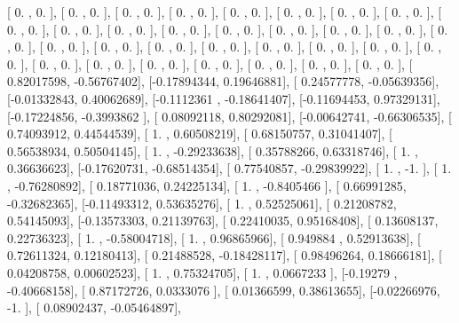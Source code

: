 \documentclass{article}
\begin{document}
       [ 0.        ,  0.        ],
       [ 0.        ,  0.        ],
       [ 0.        ,  0.        ],
       [ 0.        ,  0.        ],
       [ 0.        ,  0.        ],
       [ 0.        ,  0.        ],
       [ 0.        ,  0.        ],
       [ 0.        ,  0.        ],
       [ 0.        ,  0.        ],
       [ 0.        ,  0.        ],
       [ 0.        ,  0.        ],
       [ 0.        ,  0.        ],
       [ 0.        ,  0.        ],
       [ 0.        ,  0.        ],
       [ 0.        ,  0.        ],
       [ 0.        ,  0.        ],
       [ 0.        ,  0.        ],
       [ 0.        ,  0.        ],
       [ 0.        ,  0.        ],
       [ 0.        ,  0.        ],
       [ 0.        ,  0.        ],
       [ 0.        ,  0.        ],
       [ 0.        ,  0.        ],
       [ 0.        ,  0.        ],
       [ 0.        ,  0.        ],
       [ 0.        ,  0.        ],
       [ 0.        ,  0.        ],
       [ 0.        ,  0.        ],
       [ 0.        ,  0.        ],
       [ 0.        ,  0.        ],
       [ 0.        ,  0.        ],
       [ 0.        ,  0.        ],
       [ 0.82017598, -0.56767402],
       [-0.17894344,  0.19646881],
       [ 0.24577778, -0.05639356],
       [-0.01332843,  0.40062689],
       [-0.1112361 , -0.18641407],
       [-0.11694453,  0.97329131],
       [-0.17224856, -0.3993862 ],
       [ 0.08092118,  0.80292081],
       [-0.00642741, -0.66306535],
       [ 0.74093912,  0.44544539],
       [ 1.        ,  0.60508219],
       [ 0.68150757,  0.31041407],
       [ 0.56538934,  0.50504145],
       [ 1.        , -0.29233638],
       [ 0.35788266,  0.63318746],
       [ 1.        ,  0.36636623],
       [-0.17620731, -0.68514354],
       [ 0.77540857, -0.29839922],
       [ 1.        , -1.        ],
       [ 1.        , -0.76280892],
       [ 0.18771036,  0.24225134],
       [ 1.        , -0.8405466 ],
       [ 0.66991285, -0.32682365],
       [-0.11493312,  0.53635276],
       [ 1.        ,  0.52525061],
       [ 0.21208782,  0.54145093],
       [-0.13573303,  0.21139763],
       [ 0.22410035,  0.95168408],
       [ 0.13608137,  0.22736323],
       [ 1.        , -0.58004718],
       [ 1.        ,  0.96865966],
       [ 0.949884  ,  0.52913638],
       [ 0.72611324,  0.12180413],
       [ 0.21488528, -0.18428117],
       [ 0.98496264,  0.18666181],
       [ 0.04208758,  0.00602523],
       [ 1.        ,  0.75324705],
       [ 1.        ,  0.0667233 ],
       [-0.19279   , -0.40668158],
       [ 0.87172726,  0.0333076 ],
       [ 0.01366599,  0.38613655],
       [-0.02266976, -1.        ],
       [ 0.08902437, -0.05464897],
\end{document}
